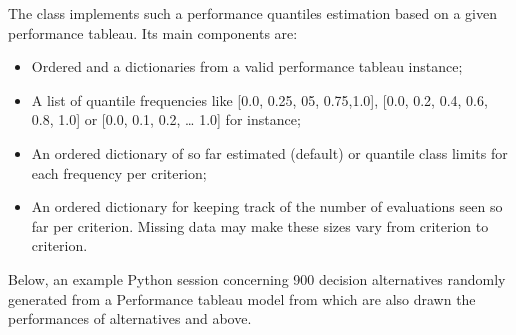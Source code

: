 \documentclass[a4paper,12pt,english]{sphinxhowto}
\begin{document}
The  class implements such a performance quantiles estimation based on a given performance tableau. Its main components are:
\begin{itemize}
\item {} 
Ordered  and a  dictionaries from a valid performance tableau instance;

\item {} 
A list  of quantile frequencies like  {[}0.0, 0.25, 05, 0.75,1.0{]},  {[}0.0, 0.2, 0.4, 0.6, 0.8, 1.0{]} or  {[}0.0, 0.1, 0.2, … 1.0{]} for instance;

\item {} 
An ordered  dictionary  of so far estimated  (default) or  quantile class limits for each frequency per criterion;

\item {} 
An ordered dictionary  for keeping track of the number of evaluations seen so far per criterion. Missing data may make these sizes vary from criterion to criterion.

\end{itemize}

Below, an example Python session concerning 900 decision alternatives randomly generated from a  Performance tableau model from which are also drawn the performances of alternatives  and  above.
\end{document}
